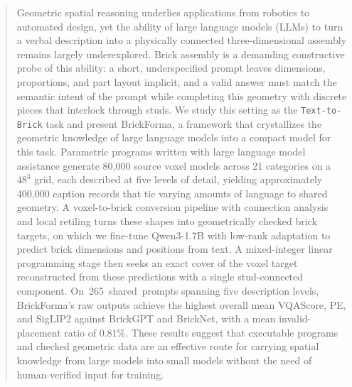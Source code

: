 \begin{abstract}
Geometric spatial reasoning underlies applications from robotics to automated design, yet the ability of large language models (LLMs) to turn a verbal description into a physically connected three-dimensional assembly remains largely underexplored. Brick assembly is a demanding constructive probe of this ability: a short, underspecified prompt leaves dimensions, proportions, and part layout implicit, and a valid answer must match the semantic intent of the prompt while completing this geometry with discrete pieces that interlock through studs. We study this setting as the \texttt{Text-to-Brick} task and present BrickForma, a framework that crystallizes the geometric knowledge of large language models into a compact model for this task. Parametric programs written with large language model assistance generate 80,000 source voxel models across 21 categories on a $48^3$ grid, each described at five levels of detail, yielding approximately 400,000 caption records that tie varying amounts of language to shared geometry. A voxel-to-brick conversion pipeline with connection analysis and local retiling turns these shapes into geometrically checked brick targets, on which we fine-tune Qwen3-1.7B with low-rank adaptation to predict brick dimensions and positions from text. A mixed-integer linear programming stage then seeks an exact cover of the voxel target reconstructed from these predictions with a single stud-connected component. On~265~shared~prompts spanning five description levels, BrickForma's raw outputs achieve the highest overall mean VQAScore, PE, and SigLIP2 against BrickGPT and BrickNet, with a mean invalid-placement ratio of 0.81\%. These results suggest that executable programs and checked geometric data are an effective route for carrying spatial knowledge from large models into small models without the need of human-verified input for training.
\end{abstract}
